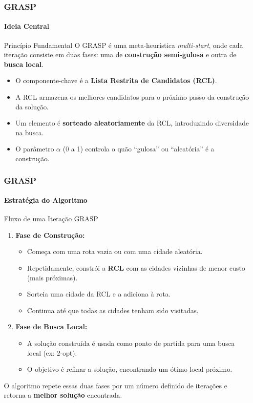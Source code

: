 \documentclass{beamer}
\begin{document}
\begin{frame}
  \frametitle{GRASP}
  \framesubtitle{Ideia Central}
  
  \begin{block}{Princípio Fundamental}
    O GRASP é uma meta-heurística \textit{multi-start}, onde cada iteração consiste em duas fases: uma de \textbf{construção semi-gulosa} e outra de \textbf{busca local}.
  \end{block}
  
  \begin{itemize}
    \item O componente-chave é a \textbf{Lista Restrita de Candidatos (RCL)}.
    \item A RCL armazena os melhores candidatos para o próximo passo da construção da solução.
    \item Um elemento é \textbf{sorteado aleatoriamente} da RCL, introduzindo diversidade na busca.
    \item O parâmetro $\alpha$ (0 a 1) controla o quão ``gulosa'' ou ``aleatória'' é a construção.
  \end{itemize}
  
\end{frame}

\begin{frame}
  \frametitle{GRASP}
  \framesubtitle{Estratégia do Algoritmo}

  \begin{block}{Fluxo de uma Iteração GRASP}
    \begin{enumerate}
      \item \textbf{Fase de Construção:}
      \begin{itemize}
        \item Começa com uma rota vazia ou com uma cidade aleatória.
        \item Repetidamente, constrói a \textbf{RCL} com as cidades vizinhas de menor custo (mais próximas).
        \item Sorteia uma cidade da RCL e a adiciona à rota.
        \item Continua até que todas as cidades tenham sido visitadas.
      \end{itemize}
      \vspace{0.5cm}
      \item \textbf{Fase de Busca Local:}
      \begin{itemize}
        \item A solução construída é usada como ponto de partida para uma busca local (ex: 2-opt).
        \item O objetivo é refinar a solução, encontrando um ótimo local próximo.
      \end{itemize}
    \end{enumerate}
  \end{block}
  
  O algoritmo repete essas duas fases por um número definido de iterações e retorna a \textbf{melhor solução} encontrada.
  
\end{frame}
\end{document}
